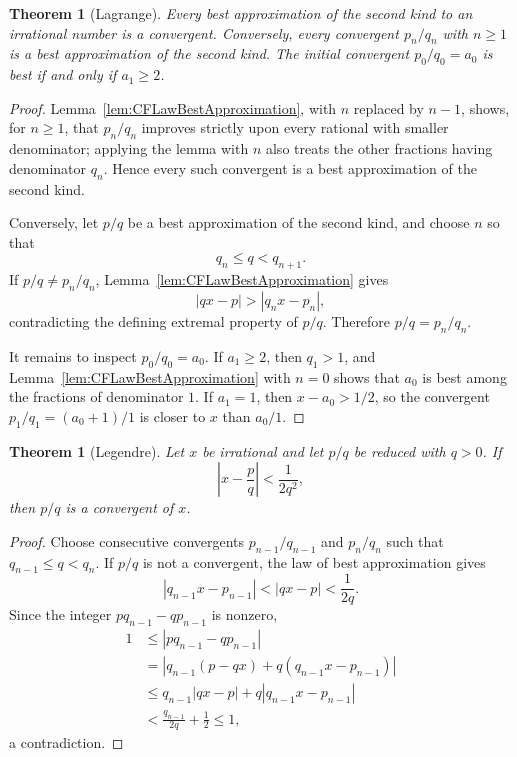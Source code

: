 \documentclass{book}
\newtheorem{theorem}[definition]{Theorem}
\begin{document}
\begin{theorem}[Lagrange]\label{thm:CFBestSecondKind}
  Every best approximation of the second kind to an irrational number is a
  convergent. Conversely, every convergent \(p_n/q_n\) with \(n\geq1\) is a
  best approximation of the second kind. The initial convergent
  \(p_0/q_0=a_0\) is best if and only if \(a_1\geq2\).
\end{theorem}

\begin{proof}
  Lemma~\ref{lem:CFLawBestApproximation}, with \(n\) replaced by \(n-1\),
  shows, for \(n\geq1\), that \(p_n/q_n\) improves strictly upon every
  rational with smaller denominator; applying the lemma with \(n\) also
  treats the other fractions having denominator \(q_n\). Hence every such
  convergent is a best approximation of the second kind.

  Conversely, let \(p/q\) be a best approximation of the second kind, and
  choose \(n\) so that
  \[
    q_n\leq q<q_{n+1}.
  \]
  If \(p/q\neq p_n/q_n\), Lemma~\ref{lem:CFLawBestApproximation} gives
  \[
    |qx-p|>|q_nx-p_n|,
  \]
  contradicting the defining extremal property of \(p/q\). Therefore
  \(p/q=p_n/q_n\).

  It remains to inspect \(p_0/q_0=a_0\). If \(a_1\geq2\), then \(q_1>1\),
  and Lemma~\ref{lem:CFLawBestApproximation} with \(n=0\) shows that \(a_0\)
  is best among the fractions of denominator \(1\). If \(a_1=1\), then
  \(x-a_0>1/2\), so the convergent
  \(p_1/q_1=(a_0+1)/1\) is closer to \(x\) than \(a_0/1\).
\end{proof}

\begin{theorem}[Legendre]\label{thm:CFLegendre}
  Let \(x\) be irrational and let \(p/q\) be reduced with \(q>0\). If
  \[
    \left|x-\frac pq\right|<\frac{1}{2q^2},
  \]
  then \(p/q\) is a convergent of \(x\).
\end{theorem}

\begin{proof}
  Choose consecutive convergents \(p_{n-1}/q_{n-1}\) and \(p_n/q_n\) such
  that \(q_{n-1}\leq q<q_n\). If \(p/q\) is not a convergent, the law of
  best approximation gives
  \[
    |q_{n-1}x-p_{n-1}|<|qx-p|<\frac{1}{2q}.
  \]
  Since the integer \(pq_{n-1}-qp_{n-1}\) is nonzero,
  \begin{align*}
    1
    &\leq |pq_{n-1}-qp_{n-1}|\\
    &=|q_{n-1}(p-qx)+q(q_{n-1}x-p_{n-1})|\\
    &\leq q_{n-1}|qx-p|+q|q_{n-1}x-p_{n-1}|\\
    &<\frac{q_{n-1}}{2q}+\frac12
    \leq1,
  \end{align*}
  a contradiction.
\end{proof}
\end{document}
